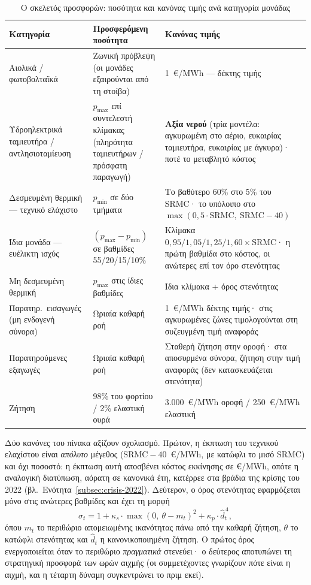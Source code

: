 \begin{table}[htbp]
\centering
\caption{Ο σκελετός προσφορών: ποσότητα και κανόνας τιμής ανά κατηγορία μονάδας}
\label{tab:bid-skeleton}
\begin{tabular}{@{}p{3.4cm}p{4.3cm}p{5.6cm}@{}}
\toprule
\textbf{Κατηγορία} & \textbf{Προσφερόμενη ποσότητα} & \textbf{Κανόνας τιμής} \\
\midrule
Αιολικά / φωτοβολταϊκά & Ζωνική πρόβλεψη (οι μονάδες εξαιρούνται από τη στοίβα) & 1~€/MWh --- δέκτης τιμής \\
Υδροηλεκτρικά ταμιευτήρα / αντλησιοταμίευση & $p_{\max}$ επί συντελεστή κλίμακας (πληρότητα ταμιευτήρων / πρόσφατη παραγωγή) & \textbf{Αξία νερού} (τρία μοντέλα: αγκυρωμένη στο αέριο, ευκαιρίας ταμιευτήρα, ευκαιρίας με άγκυρα)· ποτέ το μεταβλητό κόστος \\
Δεσμευμένη θερμική --- τεχνικό ελάχιστο & $p_{\min}$ σε δύο τμήματα & Το βαθύτερο 60\% στο 5\% του SRMC· το υπόλοιπο στο $\max(0{,}5 \cdot \text{SRMC},\ \text{SRMC} - 40)$ \\
Ίδια μονάδα --- ευέλικτη ισχύς & $(p_{\max} - p_{\min})$ σε βαθμίδες 55/20/15/10\% & Κλίμακα $0{,}95 / 1{,}05 / 1{,}25 / 1{,}60 \times \text{SRMC}$· η πρώτη βαθμίδα στο κόστος, οι ανώτερες επί τον όρο στενότητας \\
Μη δεσμευμένη θερμική & $p_{\max}$ στις ίδιες βαθμίδες & Ίδια κλίμακα + όρος στενότητας \\
Παρατηρ.\ εισαγωγές (μη ενδογενή σύνορα) & Ωριαία καθαρή ροή & 1~€/MWh δέκτης τιμής· στις αγκυρωμένες ζώνες τιμολογούνται στη συζευγμένη τιμή αναφοράς \\
Παρατηρούμενες εξαγωγές & Ωριαία καθαρή ροή & Σταθερή ζήτηση στην οροφή· στα αποσυρμένα σύνορα, ζήτηση στην τιμή αναφοράς (δεν κατασκευάζεται στενότητα) \\
Ζήτηση & 98\% του φορτίου / 2\% ελαστική ουρά & 3.000~€/MWh οροφή / 250~€/MWh ελαστική \\
\bottomrule
\end{tabular}
\end{table}

Δύο κανόνες του πίνακα αξίζουν σχολιασμό. Πρώτον, η έκπτωση του τεχνικού ελαχίστου είναι \emph{απόλυτο} μέγεθος ($\text{SRMC} - 40$~€/MWh, με κατώφλι το μισό SRMC) και όχι ποσοστό: η έκπτωση αυτή αποσβένει κόστος εκκίνησης σε €/MWh, οπότε η αναλογική διατύπωση, αόρατη σε κανονικά έτη, κατέρρεε στα βράδια της κρίσης του 2022 (βλ.\ Ενότητα~\ref{subsec:crisis-2022}). Δεύτερον, ο όρος στενότητας εφαρμόζεται μόνο στις ανώτερες βαθμίδες και έχει τη μορφή
\begin{equation}
\sigma_t = 1 + \kappa_s \cdot \max(0,\ \theta - m_t)^2 + \kappa_p \cdot \hat{d}_t^{\,4},
\label{eq:scarcity-factor}
\end{equation}
όπου $m_t$ το περιθώριο απομειωμένης ικανότητας πάνω από την καθαρή ζήτηση, $\theta$ το κατώφλι στενότητας και $\hat{d}_t$ η κανονικοποιημένη ζήτηση. Ο πρώτος όρος ενεργοποιείται όταν το περιθώριο \emph{πραγματικά} στενεύει· ο δεύτερος αποτυπώνει τη στρατηγική προσφορά των ωρών αιχμής (οι συμμετέχοντες γνωρίζουν πότε είναι η αιχμή, και η τέταρτη δύναμη συγκεντρώνει το πριμ εκεί).

